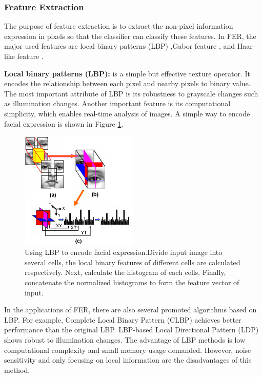 \subsubsection{Feature Extraction}
The purpose of feature extraction is to extract the non-pixel information expression in pixels so that the classifier can classify these features. In FER, the major used features are local binary patterns (LBP) \citep{ahonenFaceRecognitionLocal2004},Gabor feature \citep{lyonsCodingFacialExpressions1998}, and Haar-like feature \citep{violaRapidObjectDetection2001}.

\textbf{Local binary patterns (LBP):} is a simple but effective texture operator. It encodes the relationship between each pixel and nearby pixels to binary value. The most important attribute of LBP is its robustness to grayscale changes such as illumination changes. Another important feature is its computational simplicity, which enables real-time analysis of images. A simple way to encode facial expression is shown in Figure \ref{fig:LBP}.

\begin{figure}[H]
    \centering
    \includegraphics[width=0.5\textwidth]{./figs/LBP.jpg}
    \caption{Using LBP to encode facial expression.Divide input image into several cells, the local binary features of different cells are calculated respectively. Next, calculate the histogram of each cells. Finally, concatenate the normalized histograms to form the feature vector of input.}
    \label{fig:LBP}
\end{figure}

In the applications of FER, there are also several promoted algorithms based on LBP. For example, Complete Local Binary Pattern (CLBP)\citep{zhenhuaguoCompletedModelingLocal2010} achieves better performance than the original LBP. LBP-based Local Directional Pattern (LDP) \citep{jabidFacialExpressionRecognition2010} shows robust to illumination changes. The advantage of LBP methods is low computational complexity and small memory usage demanded. However, noise sensitivity and only focusing on local information are the disadvantages of this method.

